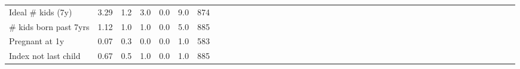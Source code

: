 {\begin{tabular}{l*{6}{ccccccc}}
\hspace{0.25cm} Ideal \# kids (7y)&     3.29&      1.2&      3.0&      0.0&      9.0&      874\\
\hspace{0.25cm} \# kids born past 7yrs&     1.12&      1.0&      1.0&      0.0&      5.0&      885\\
\hspace{0.25cm} Pregnant at 1y&     0.07&      0.3&      0.0&      0.0&      1.0&      583\\
\hspace{0.25cm} Index not last child&     0.67&      0.5&      1.0&      0.0&      1.0&      885\\
\bottomrule
\end{tabular}
}
